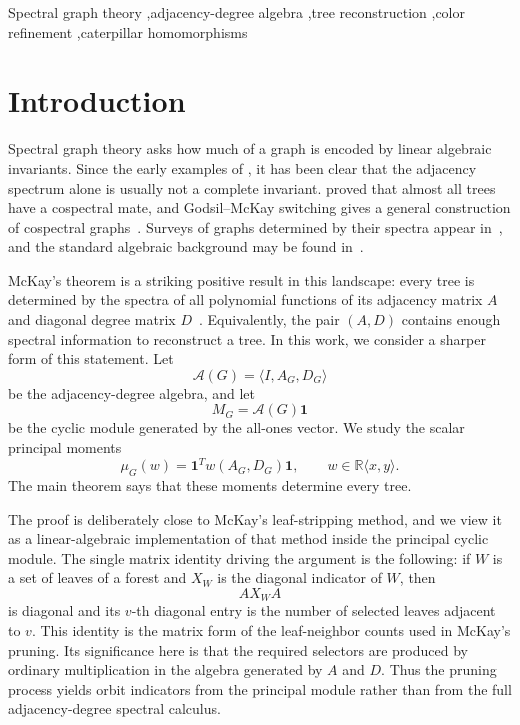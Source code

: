 \documentclass[a4paper,fleqn]{cas-sc}
\theoremstyle{definition}
\theoremstyle{remark}
\begin{document}
\begin{keywords}
Spectral graph theory \sep adjacency-degree algebra \sep tree reconstruction \sep color refinement \sep caterpillar homomorphisms
\end{keywords}

\maketitle

\section{Introduction}
\label{sec:introduction}

Spectral graph theory asks how much of a graph is encoded by linear algebraic
invariants.  Since the early examples of \citet{CollatzSinogowitz1957}, it has been clear
that the adjacency spectrum alone is usually not a complete invariant.
\citet{Schwenk1973} proved that almost all trees have a cospectral mate, and
Godsil--McKay switching gives a general construction of cospectral
graphs~\citep{GodsilMcKay1982}.  Surveys of graphs determined by their spectra
appear in~\citep{vanDamHaemers2003,vanDamHaemers2009}, and the standard
algebraic background may be found in~\citep{CvetkovicDoobSachs1980,GodsilRoyle2001}.

McKay's theorem is a striking positive result in this landscape: every tree is
determined by the spectra of all polynomial functions of its adjacency matrix
$A$ and diagonal degree matrix $D$~\citep{McKay1977}.  Equivalently, the pair
$(A,D)$ contains enough spectral information to reconstruct a tree. In this work, we consider a sharper form of this statement. Let
\[
        \mathcal A(G)=\langle I,A_G,D_G\rangle
\]
be the adjacency-degree algebra, and let
\[
        M_G=\mathcal A(G)\mathbf1
\]
be the cyclic module generated by the all-ones vector.  We study the scalar
principal moments
\[
        \mu_G(w)=\mathbf1^T w(A_G,D_G)\mathbf1,
        \qquad w\in\mathbb R\langle x,y\rangle .
\]
The main theorem says that these moments determine every tree.

The proof is deliberately close to McKay's leaf-stripping method, and we view it
as a linear-algebraic implementation of that method inside the principal cyclic
module.  The single matrix identity driving the argument is the following: if
$W$ is a set of leaves of a forest and $X_W$ is the diagonal indicator of $W$,
then
\[
        A X_W A
\]
is diagonal and its $v$-th diagonal entry is the number of selected leaves
adjacent to $v$.  This identity is the matrix form of the leaf-neighbor counts
used in McKay's pruning.  Its significance here is that the required selectors
are produced by ordinary multiplication in the algebra generated by $A$ and $D$.
Thus the pruning process yields orbit indicators from the principal module
rather than from the full adjacency-degree spectral calculus.
\end{document}
